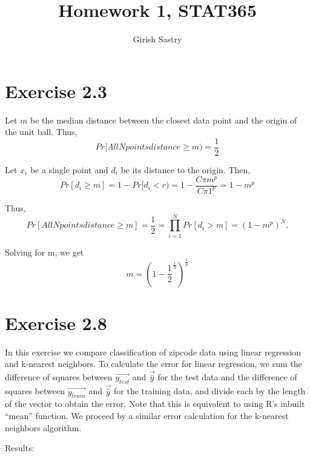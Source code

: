 \documentclass[a4paper,10pt]{article}
\title{Homework 1, STAT365}
\author{Girish Sastry}
\begin{document}
\maketitle

\section{Exercise 2.3}
Let $m$ be the median distance between the closest data point and the origin of the unit ball. Thus,
$$Pr[All N points distance \geq m) = \frac{1}{2}$$

Let $x_i$ be a single point and $d_i$ be its distance to the origin. Then,
$$Pr[d_i \geq m] = 1 - Pr[d_i < r) = 1 - \frac{C\pi m^p}{C\pi 1^p} = 1 - m^p$$

Thus,
  $$Pr[All N points distance \geq m] = \frac{1}{2} = \prod_{i=1}^N Pr[d_i > m] = (1 - m^p)^N.$$
  
Solving for m, we get
$$ m = \left(1 - \frac{1}{2}^\frac{1}{N}\right)^\frac{1}{p}$$

\section{Exercise 2.8}

In this exercise we compare classification of zipcode data using linear regression and k-nearest neighbors. 
To calculate the error for linear regression, we sum the difference of squares between $\vec{y_{test}}$ and $\vec{\hat{y}}$ for the test data
and the difference of squares between $\vec{y_{train}}$ and $\vec{\hat{y}}$ for the training data, and divide each by
the length of the vector to obtain the error. Note that this is equivalent to using R's inbuilt ``mean'' function. We proceed
by a similar error calculation for the k-nearest neighbors algorithm.

Results: \\
\end{document}
